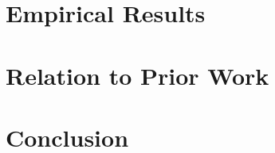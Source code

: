 \documentclass{article} %
\begin{document}
\section{Empirical Results}


\section{Relation to Prior Work}


\section{Conclusion}





\end{document}
